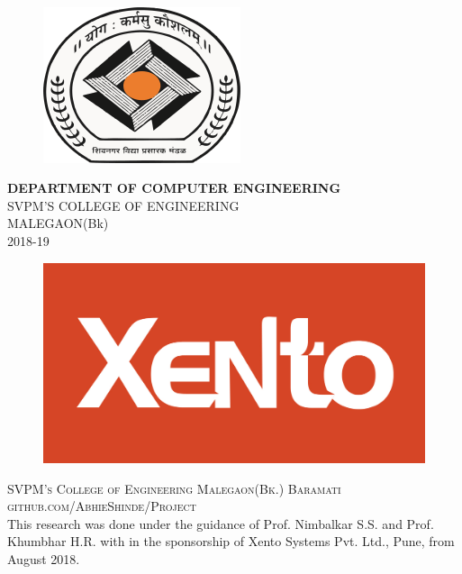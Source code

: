 \documentclass[11pt,fleqn]{book} %
\begin{document}
\newpage
~\vfill
\thispagestyle{empty}
\vspace{-5cm}
\begin{center}
	  \begin{figure}[h]
			\centering
			\includegraphics[width=5 cm]{Pictures/coem.png}
		\end{figure}
	  \fontsize{10}{10}\textbf{\LARGE DEPARTMENT OF COMPUTER ENGINEERING}\\
	  SVPM'S COLLEGE OF ENGINEERING\\
	  MALEGAON(Bk) \\
	   2018-19
	  \end{center}
	 \vspace{0cm}
\begin{center}
	  \begin{figure}[h]
			\centering
			\includegraphics[width=5 cm]{Pictures/xento_logo_1200X630.jpg}
		\end{figure}
	  \end{center}
	  \begin{center}
	  \end{center}
\vspace{2cm}

\noindent \textsc{SVPM's College of Engineering Malegaon(Bk.) Baramati}\\
\noindent \textsc{github.com/AbhieShinde/Project}\\ %
\noindent This research was done under the guidance of Prof. Nimbalkar S.S. and Prof. Khumbhar H.R. with in the sponsorship of Xento Systems Pvt. Ltd., Pune, from August 2018.\\ %
\end{document}

